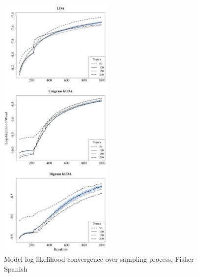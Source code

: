 \begin{figure}[t]
\begin{center}
\includegraphics[width=0.5\textwidth]{graphs/ch6/ll/fsp-lda-ll.png}
\end{center}
\caption[Log-Likelihood convergence, Fisher Spanish]{Model log-likelihood convergence over sampling process, Fisher Spanish\label{figC:llFsp}}
\end{figure}


